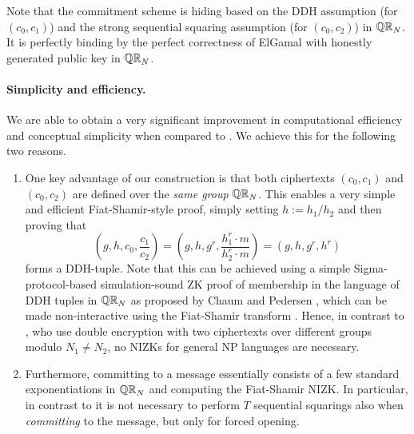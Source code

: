 Note that the commitment scheme is hiding based on the DDH assumption (for $(c_{0}, c_{1})$) and the strong sequential squaring assumption (for $(c_{0}, c_{2})$) in $\mathbb{QR}_N$. It is perfectly binding by the perfect correctness of ElGamal with honestly generated public key in $\mathbb{QR}_N$.

\paragraph{Simplicity and efficiency.}
We are able to obtain a very significant improvement in computational efficiency and conceptual simplicity when compared to \cite{TCC:KatLosXu20}. We achieve this for the following two reasons.
\begin{enumerate}
\item One key advantage of our construction is that both ciphertexts  $(c_{0}, c_{1})$ and $(c_{0}, c_{2})$ are defined over the \emph{same group} $\mathbb{QR}_N$. This enables a very simple and efficient Fiat-Shamir-style proof, simply setting $h := h_{1}/h_{2}$ and then proving that
\[
\left(g, h, c_{0}, \frac{c_{1}}{c_{2}} \right)
=
\left(g, h, g^{r}, \frac{h_{1}^{r} \cdot m}{h_{2}^{r} \cdot m} \right)
=
\left(g, h, g^{r}, h^{r} \right)
\]
forms a DDH-tuple. Note that this can be achieved using a simple Sigma-protocol-based simulation-sound ZK proof of membership in the language of DDH tuples in $\mathbb{QR}_N$ as proposed by Chaum and Pedersen \cite{C:ChaPed92}, which can be made non-interactive using the Fiat-Shamir transform \cite{C:FiaSha86}. Hence, in contrast to  \cite{TCC:KatLosXu20}, who use double encryption with two ciphertexts over different groups modulo $N_{1} \neq N_{2}$, no NIZKs for general NP languages are necessary.
\item Furthermore, committing to a message essentially consists of a few standard exponentiations in $\mathbb{QR}_N$ and computing the Fiat-Shamir NIZK. In particular, in contrast to \cite{TCC:KatLosXu20} it is not necessary to perform $T$ sequential squarings also when \emph{committing} to the message, but only for forced opening.
\end{enumerate}
 




